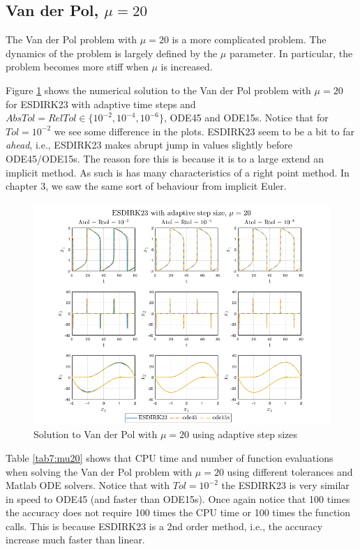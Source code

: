 \subsection{Van der Pol, $\mu = 20$}
The Van der Pol problem with $\mu = 20$ is a more complicated problem. The dynamics of the problem is largely defined by the $\mu$ parameter. In particular, the problem becomes more stiff when $\mu$ is increased.

Figure \ref{fig7:mu20} shows the numerical solution to the Van der Pol problem with $\mu = 20$ for ESDIRK23 with adaptive time steps and $AbsTol=RelTol \in \{10^{-2}, 10^{-4}, 10^{-6}\}$, ODE45 and ODE15s. Notice that for $Tol = 10^{-2}$ we see some difference in the plots. ESDIRK23 seem to be a bit to far \textit{ahead}, i.e., ESDIRK23 makes abrupt jump in values slightly before ODE45/ODE15s. The reason fore this is because it is to a large extend an implicit method. As such is has many characteristics of a right point method. In chapter 3, we saw the same sort of behaviour from implicit Euler.

\begin{figure}[H]
    \centering
    \includegraphics[width=\textwidth]{graphics/opg7/mu20.png}
    \caption{Solution to Van der Pol with $\mu = 20$ using adaptive step sizes}
    \label{fig7:mu20}
\end{figure}

Table \ref{tab7:mu20} shows that CPU time and number of function evaluations when solving the Van der Pol problem with $\mu = 20$ using different tolerances and Matlab ODE solvers. Notice that with $Tol = 10^{-2}$ the ESDIRK23 is very similar in speed to ODE45 (and faster than ODE15s). Once again notice that 100 times the accuracy does not require 100 times the CPU time or 100 times the function calls. This is because ESDIRK23 is a 2nd order method, i.e., the accuracy increase much faster than linear. 

